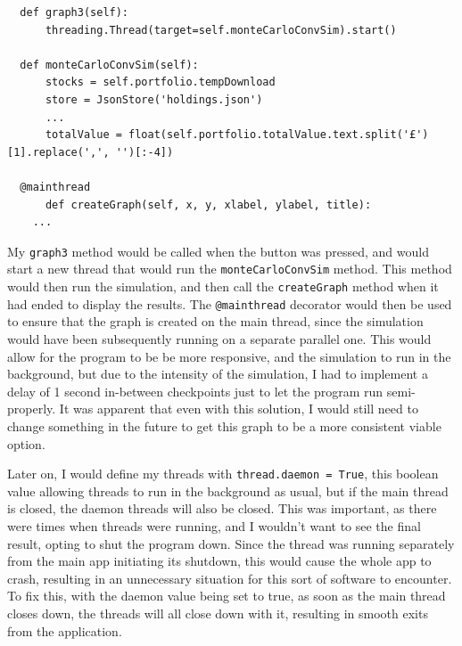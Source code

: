 \documentclass{article}
\begin{document}
\begin{verbatim}
  def graph3(self):
      threading.Thread(target=self.monteCarloConvSim).start()

  def monteCarloConvSim(self):
      stocks = self.portfolio.tempDownload
      store = JsonStore('holdings.json')
      ...
      totalValue = float(self.portfolio.totalValue.text.split('£')[1].replace(',', '')[:-4])

  @mainthread
      def createGraph(self, x, y, xlabel, ylabel, title):
    ...
\end{verbatim}

\vspace{0.3cm}
My \texttt{graph3} method would be called when the button was pressed, and would start a new thread that would run the \texttt{monteCarloConvSim} method. This method would then run the simulation, and then call the \texttt{createGraph} method  when it had ended to display the results. The \texttt{@mainthread} decorator would then be used to ensure that the graph is created on the main thread, since the simulation would have been subsequently running on a separate parallel one. This would allow for the program to be be more responsive, and the simulation to run in the background, but due to the intensity of the simulation, I had to implement a delay of 1 second in-between checkpoints just to let the program run semi-properly. It was apparent that even with this solution, I would still need to change something in the future to get this graph to be a more consistent viable option.\\\vspace{0.3cm}

Later on, I would define my threads with \texttt{thread.daemon = True}, this boolean value allowing threads to run in the background as usual, but if the main thread is closed, the daemon threads will also be closed. This was important, as there were times when threads were running, and I wouldn't want to see the final result, opting to shut the program down. Since the thread was running separately from the main app initiating its shutdown, this would cause the whole app to crash, resulting in an unnecessary situation for this sort of software to encounter. To fix this, with the daemon value being set to true, as soon as the main thread closes down, the threads will all close down with it, resulting in smooth exits from the application.\\\vspace{0.3cm}
\end{document}
